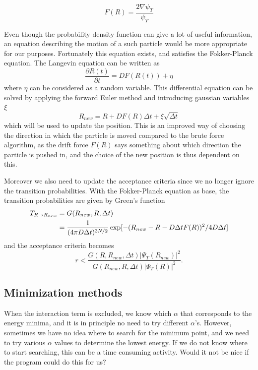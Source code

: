 \documentclass[norsk,a4paper,12pt]{article}
\begin{document}
\begin{equation}
	\label{eq:drift_force}
	F(R) = \frac{2 \nabla \psi_T}{\psi_T}
\end{equation}

Even though the probability density function can give a lot of useful information, an equation describing the motion of a such particle would be more appropriate for our purposes. Fortunately this equation exists, and satisfies the Fokker-Planck equation. The Langevin equation can be written as
\begin{equation}
\frac{\partial R(t)}{\partial t}=DF(R(t)) + \eta
\end{equation}
where $\eta$ can be considered as a random variable. This differential equation can be solved by applying the forward Euler method and introducing gaussian variables $\xi$
\begin{equation}
R_{new} = R + DF(R)\Delta t + \xi\sqrt{\Delta t}
\end{equation}
which will be used to update the position. This is an improved way of choosing the direction in which the particle is moved compared to the brute force algorithm, as the drift force $F(R)$ says something about which direction the particle is pushed in, and the choice of the new position is thus dependent on this.

Moreover we also need to update the acceptance criteria since we no longer ignore the transition probabilities. With the Fokker-Planck equation as base, the transition probabilities are given by Green's function
\begin{align}
T_{R\rightarrow R_{new}}&=G(R_{new},R,\Delta t)\notag\\
&=\frac{1}{(4\pi D\Delta t)^{3N/2}}\exp[-(R_{new} - R - D\Delta tF(R))^2/4D\Delta t] 
\end{align}
and the acceptance criteria becomes
\begin{equation}
r<\frac{G(R,R_{new},\Delta t)|\Psi_T(R_{new})|^2}{G(R_{new},R,\Delta t)|\Psi_T(R)|^2}.
\end{equation}



\subsection{Minimization methods}
When the interaction term is excluded, we know which $\alpha$ that corresponds to the energy minima, and it is in principle no need to try different $\alpha$'s. However, sometimes we have no idea where to search for the minimum point, and we need to try various $\alpha$ values to determine the lowest energy. If we do not know where to start searching, this can be a time consuming activity. Would it not be nice if the program could do this for us?
\end{document}
